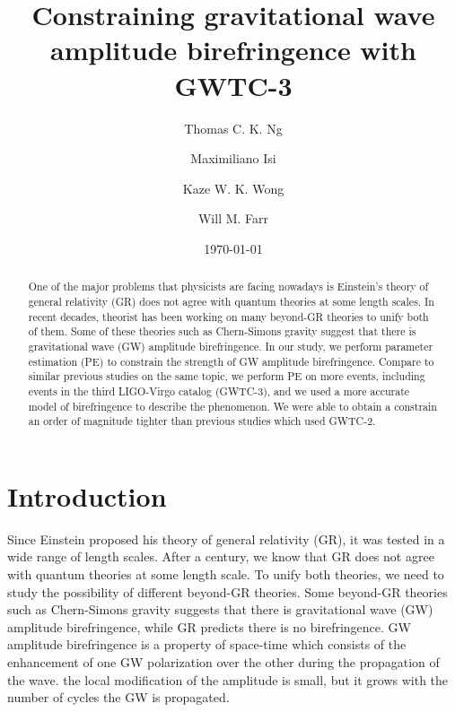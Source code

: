 \documentclass[aps,prd,twocolumn,superscriptaddress,preprintnumbers,floatfix,nofootinbib]{revtex4-2}
\begin{document}
\title{Constraining gravitational wave amplitude birefringence with GWTC-3}

\author{Thomas C. K. Ng}

\author{Maximiliano Isi}

\author{Kaze W. K. Wong}

\author{Will M. Farr}

\date{\today}

\begin{abstract}
    One of the major problems that physicists are facing nowadays is Einstein's theory of general relativity (GR) does not agree with quantum theories at some length scales.
    In recent decades, theorist has been working on many beyond-GR theories to unify both of them.
    Some of these theories such as Chern-Simons gravity suggest that there is gravitational wave (GW) amplitude birefringence.
    In our study, we perform parameter estimation (PE) to constrain the strength of GW amplitude birefringence.
    Compare to similar previous studies on the same topic, we perform PE on more events, including events in the third LIGO-Virgo catalog (GWTC-3), and we used a more accurate model of birefringence to describe the phenomenon.
    We were able to obtain a constrain an order of magnitude tighter than previous studies which used GWTC-2.
\end{abstract}

\maketitle

\section{Introduction}
\label{sec:Introduction}
Since Einstein proposed his theory of general relativity (GR), it was tested in a wide range of length scales.
After a century, we know that GR does not agree with quantum theories at some length scale.
To unify both theories, we need to study the possibility of different beyond-GR theories.
Some beyond-GR theories such as Chern-Simons gravity suggests that there is gravitational wave (GW) amplitude birefringence, while GR predicts there is no birefringence.
GW amplitude birefringence is a property of space-time which consists of the enhancement of one GW polarization over the other during the propagation of the wave.
the local modification of the amplitude is small, but it grows with the number of cycles the GW is propagated.
\end{document}
